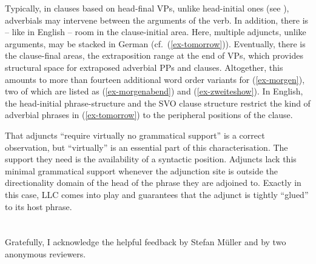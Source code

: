\documentclass[output=paper
  ,nobabel
  ,uniformtopskip %
]{langscibook}
\begin{document}
\largerpage
\noindent
Typically, in clauses based on head-final VPs, unlike head-initial ones (see \citealp[12, 43]{Haider2015,Haider2010}), adverbials may intervene between the arguments of the verb. In addition, there is – like in English – room in the clause-initial area. Here, multiple adjuncts, unlike arguments, may be stacked in German (cf.\ (\ref{ex-tomorrow})).  Eventually, there is the clause-final areas, the extraposition range at the end of VPs, which provides structural space for extraposed adverbial PPs and clauses. Altogether, this amounts to more than fourteen additional word order variants for (\ref{ex-morgen}), two of which are listed as (\ref{ex-morgenabend}) and (\ref{ex-zweiteshow}). In English, the head-initial phrase-structure and the SVO clause structure restrict the kind of adverbial phrases in (\ref{ex-tomorrow}) to the peripheral positions of the clause.

That adjuncts ``require virtually no grammatical support'' is a correct observation, but ``virtually'' is an essential part of this characterisation. The support they need is the availability of a syntactic position. Adjuncts lack this minimal grammatical support whenever the adjunction site is outside the directionality domain of the head of the phrase they are adjoined to. Exactly in this case, LLC comes into play and guarantees that the adjunct is tightly ``glued'' to its host phrase.



\section*{\acknowledgmentsUS}

Gratefully, I acknowledge the helpful feedback by Stefan Müller and by two anonymous reviewers. 

{\sloppy
\printbibliography[heading=subbibliography,notkeyword=this]
}
\end{document}
